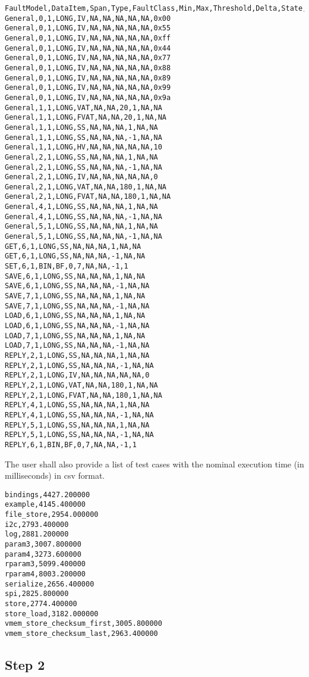 \begin{lstlisting}
FaultModel,DataItem,Span,Type,FaultClass,Min,Max,Threshold,Delta,State,Value
General,0,1,LONG,IV,NA,NA,NA,NA,NA,0x00
General,0,1,LONG,IV,NA,NA,NA,NA,NA,0x55
General,0,1,LONG,IV,NA,NA,NA,NA,NA,0xff
General,0,1,LONG,IV,NA,NA,NA,NA,NA,0x44
General,0,1,LONG,IV,NA,NA,NA,NA,NA,0x77
General,0,1,LONG,IV,NA,NA,NA,NA,NA,0x88
General,0,1,LONG,IV,NA,NA,NA,NA,NA,0x89
General,0,1,LONG,IV,NA,NA,NA,NA,NA,0x99
General,0,1,LONG,IV,NA,NA,NA,NA,NA,0x9a
General,1,1,LONG,VAT,NA,NA,20,1,NA,NA
General,1,1,LONG,FVAT,NA,NA,20,1,NA,NA
General,1,1,LONG,SS,NA,NA,NA,1,NA,NA
General,1,1,LONG,SS,NA,NA,NA,-1,NA,NA
General,1,1,LONG,HV,NA,NA,NA,NA,NA,10
General,2,1,LONG,SS,NA,NA,NA,1,NA,NA
General,2,1,LONG,SS,NA,NA,NA,-1,NA,NA
General,2,1,LONG,IV,NA,NA,NA,NA,NA,0
General,2,1,LONG,VAT,NA,NA,180,1,NA,NA
General,2,1,LONG,FVAT,NA,NA,180,1,NA,NA
General,4,1,LONG,SS,NA,NA,NA,1,NA,NA
General,4,1,LONG,SS,NA,NA,NA,-1,NA,NA
General,5,1,LONG,SS,NA,NA,NA,1,NA,NA
General,5,1,LONG,SS,NA,NA,NA,-1,NA,NA
GET,6,1,LONG,SS,NA,NA,NA,1,NA,NA
GET,6,1,LONG,SS,NA,NA,NA,-1,NA,NA
SET,6,1,BIN,BF,0,7,NA,NA,-1,1
SAVE,6,1,LONG,SS,NA,NA,NA,1,NA,NA
SAVE,6,1,LONG,SS,NA,NA,NA,-1,NA,NA
SAVE,7,1,LONG,SS,NA,NA,NA,1,NA,NA
SAVE,7,1,LONG,SS,NA,NA,NA,-1,NA,NA
LOAD,6,1,LONG,SS,NA,NA,NA,1,NA,NA
LOAD,6,1,LONG,SS,NA,NA,NA,-1,NA,NA
LOAD,7,1,LONG,SS,NA,NA,NA,1,NA,NA
LOAD,7,1,LONG,SS,NA,NA,NA,-1,NA,NA
REPLY,2,1,LONG,SS,NA,NA,NA,1,NA,NA
REPLY,2,1,LONG,SS,NA,NA,NA,-1,NA,NA
REPLY,2,1,LONG,IV,NA,NA,NA,NA,NA,0
REPLY,2,1,LONG,VAT,NA,NA,180,1,NA,NA
REPLY,2,1,LONG,FVAT,NA,NA,180,1,NA,NA
REPLY,4,1,LONG,SS,NA,NA,NA,1,NA,NA
REPLY,4,1,LONG,SS,NA,NA,NA,-1,NA,NA
REPLY,5,1,LONG,SS,NA,NA,NA,1,NA,NA
REPLY,5,1,LONG,SS,NA,NA,NA,-1,NA,NA
REPLY,6,1,BIN,BF,0,7,NA,NA,-1,1
\end{lstlisting}

The user shall also provide a list of test cases with the nominal execution time (in milliseconds) in csv format.

\begin{lstlisting}
bindings,4427.200000
example,4145.400000
file_store,2954.000000
i2c,2793.400000
log,2881.200000
param3,3007.800000
param4,3273.600000
rparam3,5099.400000
rparam4,8003.200000
serialize,2656.400000
spi,2825.800000
store,2774.400000
store_load,3182.000000
vmem_store_checksum_first,3005.800000
vmem_store_checksum_last,2963.400000
\end{lstlisting}

\subsection{Step 2}

